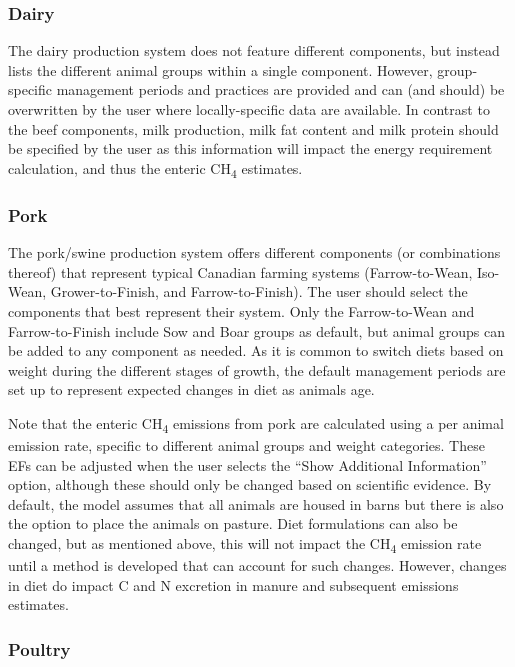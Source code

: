 \subsubsection{Dairy}

The dairy production system does not feature different components, but instead
lists the different animal groups within a single component. However,
group-specific management periods and practices are provided and can (and
should) be overwritten by the user where locally-specific data are available.
In contrast to the beef components, milk production, milk fat content and milk
protein should be specified by the user as this information will impact the
energy requirement calculation, and thus the enteric CH\textsubscript{4}
estimates.

\subsubsection{Pork}

The pork/swine production system offers different components (or combinations
thereof) that represent typical Canadian farming systems (Farrow-to-Wean,
Iso-Wean, Grower-to-Finish, and Farrow-to-Finish). The user should select the
components that best represent their system. Only the Farrow-to-Wean and
Farrow-to-Finish include Sow and Boar groups as default, but animal groups can
be added to any component as needed. As it is common to switch diets based on
weight during the different stages of growth, the default management periods are
set up to represent expected changes in diet as animals age.

Note that the enteric CH\textsubscript{4} emissions from pork are calculated
using a per animal emission rate, specific to different animal groups and weight
categories. These EFs can be adjusted when the user selects the ``Show
Additional Information'' option, although these should only be changed based on
scientific evidence. By default, the model assumes that all animals are housed
in barns but there is also the option to place the animals on pasture. Diet
formulations can also be changed, but as mentioned above, this will not impact
the CH\textsubscript{4} emission rate until a method is developed that can
account for such changes. However, changes in diet do impact C and N excretion
in manure and subsequent emissions estimates.

\subsubsection{Poultry}

